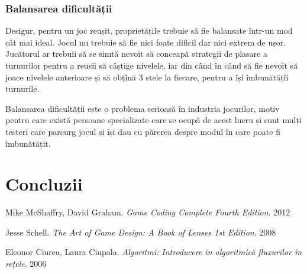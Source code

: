\documentclass[12pt, a4paper]{article}
\begin{document}
	
	
	\subsubsection{Balansarea dificultății}
	
	Desigur, pentru un joc reușit, proprietățile trebuie să fie balansate într-un mod cât mai ideal. Jocul nu trebuie să fie nici foate dificil dar nici extrem de ușor. Jucătorul ar trebuii să se simtă nevoit să conceapă strategii de plasare a turnurilor pentru a reusii să câștige nivelele, iar din când în când să fie nevoit să joace nivelele anterioare și să obțînă 3 stele la fiecare, pentru a își îmbunătățîi turnurile.
	\newline
	
	Balansarea dificultății este o problema serioasă în industria jocurilor, motiv pentru care există persoane specializate care se ocupă de acest lucru și sunt mulți testeri care parcurg jocul și își dau cu părerea despre modul în care poate fi îmbunătățit.
	
	
	
	
	
	\section{Concluzii}
	
	
	
	
	
	\pagebreak
	\begin{thebibliography}{3}
		Mike McShaffry, David Graham. \newline
		\textit{Game Coding Complete Fourth Edition}. 2012
		
		Jesse Schell.  \newline
		\textit{The Art of Game Design: A Book of Lenses 1st Edition}. 2008
		
		Eleonor Ciurea, Laura Ciupala.  \newline
		\textit{Algoritmi: Introducere în algoritmică fluxurilor în rețele}. 2006
		
		
	\end{thebibliography}
	
	
\end{document}
